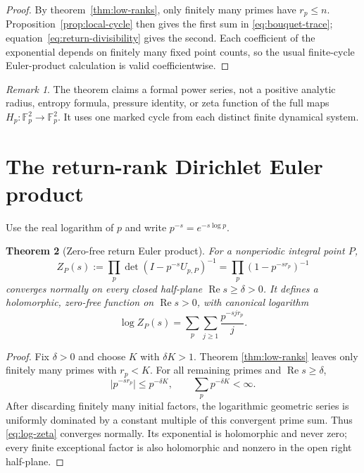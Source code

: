 \documentclass[11pt]{article}
\newtheorem{theorem}{Theorem}[section]
\theoremstyle{remark}
\newtheorem{remark}[theorem]{Remark}
\newcommand{\RePart}{\operatorname{Re}}
\newcommand{\Fp}{\mathbb F_p}
\begin{document}
\begin{proof}
By theorem~\ref{thm:low-ranks}, only finitely many primes have \(r_p\le n\).
Proposition~\ref{prop:local-cycle} then gives the first sum in
\eqref{eq:bouquet-trace}; equation~\eqref{eq:return-divisibility} gives the
second.  Each coefficient of the exponential depends on finitely many fixed
point counts, so the usual finite-cycle Euler-product calculation is valid
coefficientwise.
\end{proof}

\begin{remark}
The theorem claims a formal power series, not a positive analytic radius,
entropy formula, pressure identity, or zeta function of the full maps
\(H_p:\Fp^2\to\Fp^2\).  It uses one marked cycle from each distinct finite
dynamical system.
\end{remark}

\section{The return-rank Dirichlet Euler product}

Use the real logarithm of \(p\) and write \(p^{-s}=e^{-s\log p}\).

\begin{theorem}[Zero-free return Euler product]
\label{thm:euler-product}
For a nonperiodic integral point \(P\),
\[
 Z_P(s)
 :=\prod_p\det(I-p^{-s}U_{p,P})^{-1}
 =\prod_p(1-p^{-s r_p})^{-1}
 \label{eq:dirichlet-zeta}
\]
converges normally on every closed half-plane
\(\RePart s\ge\delta>0\).  It defines a holomorphic, zero-free function on
\(\RePart s>0\), with canonical logarithm
\[
 \log Z_P(s)
 =\sum_p\sum_{j\ge1}\frac{p^{-s j r_p}}j.
 \label{eq:log-zeta}
\]
\end{theorem}

\begin{proof}
Fix \(\delta>0\) and choose \(K\) with \(\delta K>1\).  Theorem
\ref{thm:low-ranks} leaves only finitely many primes with \(r_p<K\).  For all
remaining primes and \(\RePart s\ge\delta\),
\[
 |p^{-s r_p}|\le p^{-\delta K},
 \qquad
 \sum_p p^{-\delta K}<\infty.
\]
After discarding finitely many initial factors, the logarithmic geometric
series is uniformly dominated by a constant multiple of this convergent
prime sum.  Thus \eqref{eq:log-zeta} converges normally.  Its exponential is
holomorphic and never zero; every finite exceptional factor is also
holomorphic and nonzero in the open right half-plane.
\end{proof}
\end{document}
